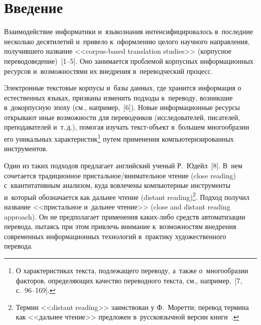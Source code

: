   
\vspace*{-3pt}



\thispagestyle{headings}

\begin{multicols}{2}

\label{st\stat}
  
  \section{Введение}

  \vspace*{-2pt}
  
  Взаимодействие информатики и~языкознания интенсифицировалось 
в~последние несколько десятилетий и~привело к~оформлению целого 
научного направления, получившего название <<\mbox{corpus-based} translation 
studies>> (корпусное переводоведение)~[1--5]. Оно занимается проблемой 
корпусных информационных ресурсов и~возможностями их внедрения 
в~переводческий процесс.
  
  Электронные текстовые корпусы и~базы данных, где хранится информация 
о естественных языках, призваны изменить подходы к~переводу, возникшие 
в~докорпусную эпоху (см., например,~[6]). Новые информационные ресурсы 
открывают иные возможности для переводчиков (исследователей, писателей, 
преподавателей и~т.\,д.), помогая изучать текст-объ\-ект в~большем 
многообразии его уникальных характеристик\footnote[2]{О характеристиках 
текста, подлежащего переводу, а~также о~многообразии факторов, 
определяющих качество переводного текста, см., например,~[7, с.~96--169].} 
путем применения компьютеризированных инструментов.
  
  Один из таких подходов предлагает английский ученый Р.~Юдейл~[8]. 
В~нем сочетается традиционное присталь\-ное/вни\-ма\-тель\-ное чтение 
(close reading) с~квантитативным анализом, куда вовлечены компьютерные 
инструменты и~который обозначается как дальнее чтение (distant 
reading)\footnote[3]{Термин <<distant reading>> заимствован у Ф.~Моретти; перевод термина как
<<дальнее чтение>> предложен в~русскоязычной версии книги~\cite{9-n}.}. Подход получил название <<пристальное 
и~дальнее чтение>> (close and distant reading approach). Он не предполагает 
применения ка\-ких-ли\-бо средств автоматизации перевода, пытаясь при 
этом привлечь внимание к~возможностям внедрения современных 
информационных технологий в~практику художественного перевода.
  

\end{multicols}
